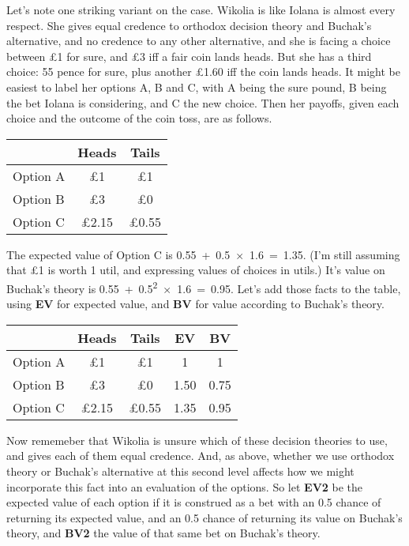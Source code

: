 \documentclass[
  10pt,
  letterpaper,
  twoside]{scrbook}
\begin{document}
Let's note one striking variant on the case. {Wikolia} is like {Iolana}
is almost every respect. She gives equal credence to orthodox decision
theory and Buchak's alternative, and no credence to any other
alternative, and she is facing a choice between £1 for sure, and £3 iff
a fair coin lands heads. But she has a third choice: 55 pence for sure,
plus another £1.60 iff the coin lands heads. It might be easiest to
label her options A, B and C, with A being the sure pound, B being the
bet {Iolana} is considering, and C the new choice. Then her payoffs,
given each choice and the outcome of the coin toss, are as follows.

\begin{longtable}[]{@{}lcc@{}}
\toprule\noalign{}
& Heads & Tails \\
\midrule\noalign{}
\endhead
\bottomrule\noalign{}
\endlastfoot
Option A & £1 & £1 \\
Option B & £3 & £0 \\
Option C & £2.15 & £0.55 \\
\end{longtable}

The expected value of Option C is 0.55~+~0.5~×~1.6~=~1.35. (I'm still
assuming that £1 is worth 1 util, and expressing values of choices in
utils.) It's value on Buchak's theory is
0.55~+~0.5\textsuperscript{2}~×~1.6~=~0.95. Let's add those facts to the
table, using \textbf{EV} for expected value, and \textbf{BV} for value
according to Buchak's theory.

\begin{longtable}[]{@{}lcccc@{}}
\toprule\noalign{}
& Heads & Tails & EV & BV \\
\midrule\noalign{}
\endhead
\bottomrule\noalign{}
\endlastfoot
Option A & £1 & £1 & 1 & 1 \\
Option B & £3 & £0 & 1.50 & 0.75 \\
Option C & £2.15 & £0.55 & 1.35 & 0.95 \\
\end{longtable}

Now rememeber that {Wikolia} is unsure which of these decision theories
to use, and gives each of them equal credence. And, as above, whether we
use orthodox theory or Buchak's alternative at this second level affects
how we might incorporate this fact into an evaluation of the options. So
let \textbf{EV2} be the expected value of each option if it is construed
as a bet with an 0.5 chance of returning its expected value, and an 0.5
chance of returning its value on Buchak's theory, and \textbf{BV2} the
value of that same bet on Buchak's theory.
\end{document}
